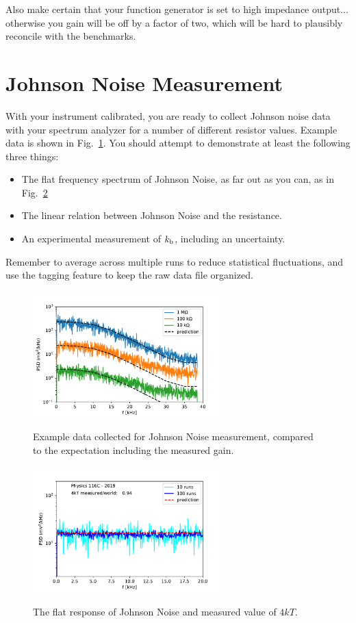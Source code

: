 \documentclass[12pt]{article}
\newcommand{\kb}{k_{\rm b}}
\begin{document}
Also make certain that your function generator is set to high impedance output... otherwise you gain will be off by a factor of two, which will be hard to plausibly reconcile with the benchmarks.

\section{Johnson Noise Measurement}

With your instrument calibrated, you are ready to collect Johnson noise data with your spectrum analyzer for a number of different resistor values.  Example data is shown in Fig.~\ref{fig:compare_psd}.  You should attempt to demonstrate at least the following three things:
\begin{itemize}
\item The flat frequency spectrum of Johnson Noise, as far out as you can, as in Fig.~\ref{fig:final}
\item The linear relation between Johnson Noise and the resistance. 
\item An experimental measurement of $\kb$, including an uncertainty.
\end{itemize}
Remember to average across multiple runs to reduce statistical fluctuations, and use the tagging feature to keep the raw data file organized.

\begin{figure}[htbp]
\begin{center}
{\includegraphics[width=0.65\textwidth]{figs/noise_vs_pred.pdf}}
\end{center}
\caption{\label{fig:compare_psd}  Example data collected for Johnson Noise measurement, compared to the expectation including the measured gain.}\end{figure}

\begin{figure}[htbp]
\begin{center}
{\includegraphics[width=0.65\textwidth]{figs/final.pdf}}
\end{center}
\caption{\label{fig:final}  The flat response of Johnson Noise and measured value of $4kT$. }\end{figure}
\end{document}
